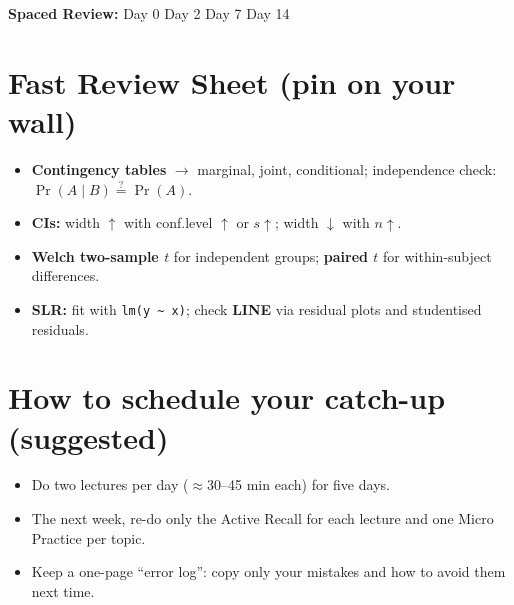 \documentclass[11pt,a4paper]{article}
\newcommand{\reviewticks}{
  \vspace{0.4em}
  \noindent\scriptsize\textbf{Spaced Review:}
  \fbox{\phantom{D0}} Day 0\quad
  \fbox{\phantom{D2}} Day 2\quad
  \fbox{\phantom{D7}} Day 7\quad
  \fbox{\phantom{D14}} Day 14
}
\begin{document}
\reviewticks

\section*{Fast Review Sheet (pin on your wall)}

\begin{tcolorbox}[colback=SoftBg,colframe=Accent!40!black,breakable,boxrule=0.5pt,arc=2mm]
\begin{itemize}
  \item \textbf{Contingency tables} $\rightarrow$ marginal, joint, conditional; independence check: \( \Pr(A\mid B) \stackrel{?}{=} \Pr(A) \).
  \item \textbf{CIs:} width $\uparrow$ with conf.level $\uparrow$ or $s \uparrow$; width $\downarrow$ with $n \uparrow$.
  \item \textbf{Welch two-sample $t$} for independent groups; \textbf{paired $t$} for within-subject differences.
  \item \textbf{SLR:} fit with \texttt{lm(y \textasciitilde\ x)}; check \textbf{LINE} via residual plots and studentised residuals.
\end{itemize}
\end{tcolorbox}

\section*{How to schedule your catch-up (suggested)}

\begin{tcolorbox}[colback=SoftBg,colframe=Accent!40!black,breakable,boxrule=0.5pt,arc=2mm]
\begin{itemize}
  \item Do two lectures per day ($\approx$30--45 min each) for five days.
  \item The next week, re-do only the Active Recall for each lecture and one Micro Practice per topic.
  \item Keep a one-page ``error log'': copy only your mistakes and how to avoid them next time.
\end{itemize}
\end{tcolorbox}
\end{document}
